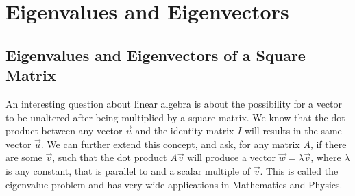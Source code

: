 \chapter{Eigenvalues and Eigenvectors}

\section{Eigenvalues and Eigenvectors of a Square Matrix}
\label{eigensection}

An interesting question about linear algebra is about the possibility for a vector to be unaltered after being multiplied by a square matrix. We know that the dot product between any vector $\vec{u}$ and the identity matrix $I$ will results in the same vector $\vec{u}$. We can further extend this concept, and ask, for any matrix $A$, if there are some $\vec{v}$, such that the dot product $A\vec{v}$ will produce a vector $\vec{w} = \lambda\vec{v}$, where $\lambda$ is any constant, that is parallel to and a scalar multiple of $\vec{v}$. This is called the eigenvalue problem and has very wide applications in Mathematics and Physics.


